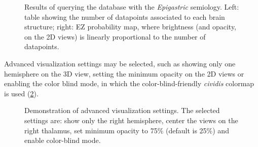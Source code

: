\begin{figure}
  \centering
  \caption[Results of querying the database with the \textit{Epigastric} semiology]{
    Results of querying the database with the \textit{Epigastric} semiology.
    Left: table showing the number of datapoints associated to each brain structure;
    right: \ac{EZ} probability map, where brightness (and opacity, on the 2D views) is linearly proportional to the number of datapoints.
  }
  \label{fig:svt_query}
\end{figure}


Advanced visualization settings may be selected, such as
showing only one hemisphere on the 3D view,
setting the minimum opacity on the 2D views or
enabling the color blind mode, in which the color-blind-friendly \textit{cividis} colormap is used \cite{nunez_optimizing_2018} (\cref{fig:svt_advanced}).

\begin{figure}
  \centering
  \caption[Demonstration of advanced visualization settings]{
    Demonstration of advanced visualization settings.
    The selected settings are:
    show only the right hemisphere,
    center the views on the right thalamus,
    set minimum opacity to 75\% (default is 25\%)
    and enable color-blind mode.
  }
  \label{fig:svt_advanced}
\end{figure}
